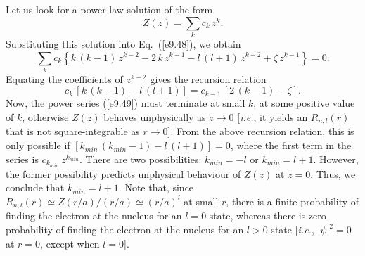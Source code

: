 Let us look for a power-law solution of the form
\begin{equation}\label{e9.49}
Z(z) = \sum_k c_k\,z^k.
\end{equation}
Substituting this solution into Eq.~(\ref{e9.48}), we obtain
\begin{equation}
\sum_k c_k\left\{k\,(k-1)\,z^{k-2} - 2\,k\,z^{k-1} - l\,(l+1)\,z^{k-2}
+ \zeta\,z^{k-1}\right\} = 0.
\end{equation}
Equating the coefficients of $z^{k-2}$ gives the recursion relation
\begin{equation}\label{e9.51}
c_k\,\left[k\,(k-1)-l\,(l+1)\right] = c_{k-1}\,\left[2\,(k-1) - \zeta\right].
\end{equation}
Now, the power series  (\ref{e9.49}) must terminate at small $k$, at
some positive value of $k$, otherwise  $Z(z)$ 
behaves unphysically as $z\rightarrow 0$ [{\em i.e.}, it yields an $R_{n,l}(r)$ that is not square-integrable
as $r\rightarrow  0$]. From the above recursion relation, this is only possible if $[k_{min}\,(k_{min}-1)-l\,(l+1)]=0$, where the first term in the series is $c_{k_{min}}\,z^{k_{min}}$. There are two possibilities: $k_{min}=-l$
or $k_{min}=l+1$. However, the former possibility predicts unphysical behaviour of
$Z(z)$ at $z=0$. Thus, we conclude that $k_{min}=l+1$. 
Note that, since $R_{n,l}(r)\simeq Z(r/a)/(r/a)\simeq (r/a)^l$ at small $r$, there is a finite
probability of finding the electron at the nucleus for an $l=0$ state, whereas
there is zero probability of finding the electron at the nucleus for
an $l>0$ state [{\em i.e.}, $|\psi|^2=0$ at $r=0$, except when
$l=0$].

